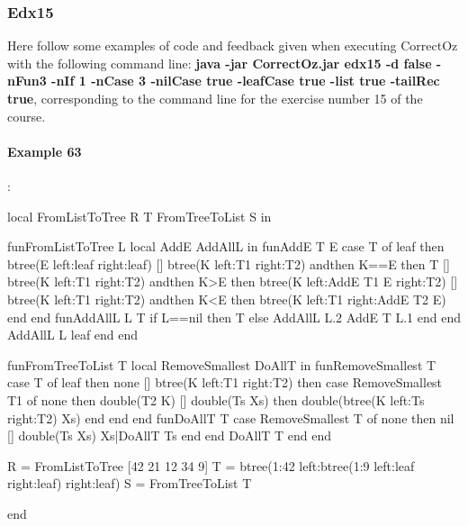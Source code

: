 \documentclass[11pt,a4paper,twoside,openright]{report}
\begin{document}
\subsubsection{Edx15}
Here follow some examples of code and feedback given when executing 
CorrectOz with the following command line: \textbf{java -jar CorrectOz.jar edx15 -d 
false -nFun3 -nIf 1 -nCase 3 -nilCase true -leafCase true -list true -tailRec 
true}, corresponding to the command line for the exercise number 15 of the 
course.

\paragraph{Example 63}:

\begin{OZ}
local FromListToTree R T FromTreeToList S in
    

fun{FromListToTree L}
    local AddE AddAllL in
        fun{AddE T E}
            case T
            of leaf then btree(E left:leaf right:leaf)
            [] btree(K left:T1 right:T2) andthen K==E then
                T
            [] btree(K left:T1 right:T2) andthen K>E then
                btree(K left:{AddE T1 E} right:T2)
            [] btree(K left:T1 right:T2) andthen K<E then
                btree(K left:T1 right:{AddE T2 E})
            end
        end
        fun{AddAllL L T}
            if L==nil then T
            else {AddAllL L.2 {AddE T L.1}} end
        end
        {AddAllL L leaf}
    end
end

fun{FromTreeToList T}
    local RemoveSmallest DoAllT in
        fun{RemoveSmallest T}
            case T
            of leaf then none
            [] btree(K left:T1 right:T2) then
                case {RemoveSmallest T1}
                of none then double(T2 K)
                [] double(Ts Xs) then
                    double(btree(K left:Ts right:T2) Xs)
                end
            end
        end
        fun{DoAllT T}
            case {RemoveSmallest T}
            of none then nil
            [] double(Ts Xs)
                Xs|{DoAllT Ts}
            end
        end
        {DoAllT T}
    end
end

    R = {FromListToTree [42 21 12 34 9]}
    T = btree(1:42 left:btree(1:9 left:leaf right:leaf) right:leaf)
    S = {FromTreeToList T}

    
end


\end{OZ}
\end{document}
